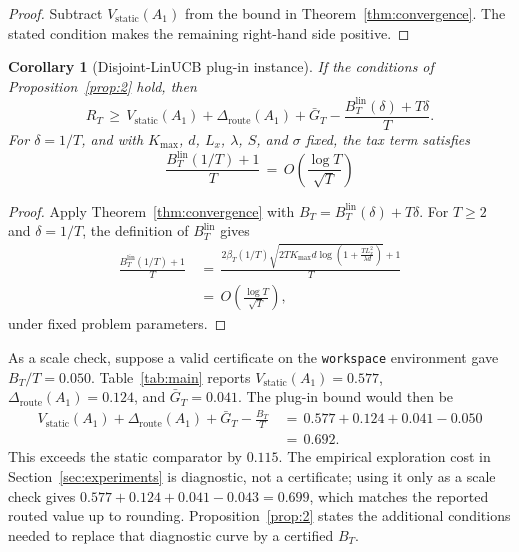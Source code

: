 \documentclass{article} %
\newtheorem{corollary}[theorem]{Corollary}
\begin{document}
\begin{proof}
Subtract \(V_{\mathrm{static}}(A_1)\) from the bound in
Theorem~\ref{thm:convergence}.  The stated condition makes the remaining
right-hand side positive.
\end{proof}

\begin{corollary}[Disjoint-LinUCB plug-in instance]
\label{cor:app-linucb-plugin}
If the conditions of Proposition~\ref{prop:2} hold, then
\begin{equation}
R_T
\,\geq\,
V_{\mathrm{static}}(A_1)
+
\Delta_{\mathrm{route}}(A_1)
+
\bar G_T
-
\frac{B_T^{\mathrm{lin}}(\delta)+T\delta}{T}.
\end{equation}
For \(\delta=1/T\), and with \(K_{\max}\), \(d\), \(L_x\), \(\lambda\), \(S\),
and \(\sigma\) fixed, the tax term satisfies
\begin{equation}
\frac{B_T^{\mathrm{lin}}(1/T)+1}{T}
\,=\,
O\!\left(\frac{\log T}{\sqrt T}\right)
\end{equation}
\end{corollary}

\begin{proof}
Apply Theorem~\ref{thm:convergence} with
\(B_T=B_T^{\mathrm{lin}}(\delta)+T\delta\).  For \(T\geq2\) and
\(\delta=1/T\), the definition of \(B_T^{\mathrm{lin}}\) gives
\begin{equation}
\begin{aligned}
\frac{B_T^{\mathrm{lin}}(1/T)+1}{T}
&\,=\,
\frac{
2\beta_T(1/T)
\sqrt{
2T K_{\max}d
\log\!\left(1+\frac{T L_x^2}{\lambda d}\right)
}
+1
}{T}
\\
&\,=\,
O\!\left(\frac{\log T}{\sqrt T}\right),
\end{aligned}
\end{equation}
under fixed problem parameters.
\end{proof}

As a scale check, suppose a valid certificate on the \texttt{workspace}
environment gave \(B_T/T=0.050\).  Table~\ref{tab:main} reports
\(V_{\mathrm{static}}(A_1)=0.577\),
\(\Delta_{\mathrm{route}}(A_1)=0.124\), and \(\bar G_T=0.041\).  The plug-in
bound would then be
\begin{equation}
\begin{aligned}
V_{\mathrm{static}}(A_1)
+
\Delta_{\mathrm{route}}(A_1)
+
\bar G_T
-
\frac{B_T}{T}
&\,=\,
0.577+0.124+0.041-0.050
\\
&\,=\,
0.692.
\end{aligned}
\end{equation}
This exceeds the static comparator by \(0.115\).  The empirical exploration
cost in Section~\ref{sec:experiments} is diagnostic, not a certificate; using
it only as a scale check gives
\(0.577+0.124+0.041-0.043=0.699\), which matches the reported routed value up
to rounding.  Proposition~\ref{prop:2} states the additional conditions needed
to replace that diagnostic curve by a certified \(B_T\).
\end{document}
